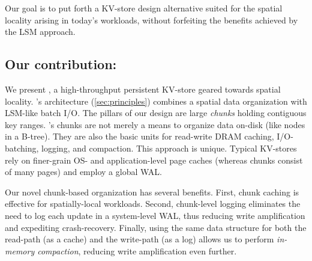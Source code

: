 Our  goal is to 
put forth a KV-store design alternative  suited for the 
spatial locality arising in today's  workloads, without forfeiting the benefits achieved by the LSM approach.




\subsection{Our contribution: \sys}

We present \sys, a high-throughput persistent KV-store geared towards spatial locality. 
\sys's  architecture (\cref{sec:principles}) combines a spatial data organization with LSM-like  batch I/O. 
The pillars of our design are large \emph{chunks} holding contiguous key ranges. 
\sys's chunks are not merely  a means to organize data on-disk (like nodes in a B-tree). They 
are also the basic units for read-write DRAM caching, I/O-batching, logging, and compaction. 
This approach is unique.
Typical KV-stores rely on finer-grain OS- and application-level page caches (whereas chunks consist of many pages) and employ a global WAL. 


Our novel chunk-based organization has several benefits. 
First, chunk caching is effective for spatially-local workloads.
Second, chunk-level logging eliminates the need to log each update in a system-level WAL, thus 
reducing write amplification and expediting crash-recovery. 
Finally, using the same data structure for both the read-path (as a cache) and the write-path
(as a log) allows us to perform \emph{in-memory compaction}, reducing write amplification even further.


